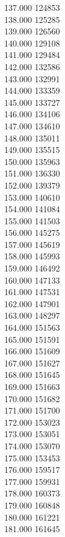 { 137.000	124853 \\
 138.000	125285 \\
 139.000	126560 \\
 140.000	129108 \\
 141.000	129484 \\
 142.000	132586 \\
 143.000	132991 \\
 144.000	133359 \\
 145.000	133727 \\
 146.000	134106 \\
 147.000	134610 \\
 148.000	135011 \\
 149.000	135515 \\
 150.000	135963 \\
 151.000	136330 \\
 152.000	139379 \\
 153.000	140610 \\
 154.000	141084 \\
 155.000	141503 \\
 156.000	145275 \\
 157.000	145619 \\
 158.000	145993 \\
 159.000	146492 \\
 160.000	147133 \\
 161.000	147531 \\
 162.000	147901 \\
 163.000	148297 \\
 164.000	151563 \\
 165.000	151591 \\
 166.000	151609 \\
 167.000	151627 \\
 168.000	151645 \\
 169.000	151663 \\
 170.000	151682 \\
 171.000	151700 \\
 172.000	153023 \\
 173.000	153051 \\
 174.000	153070 \\
 175.000	153453 \\
 176.000	159517 \\
 177.000	159931 \\
 178.000	160373 \\
 179.000	160848 \\
 180.000	161221 \\
 181.000	161645 \\
}
